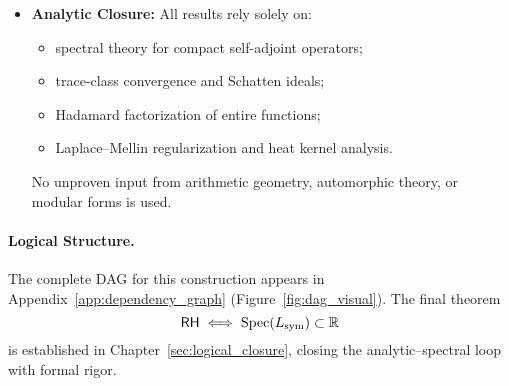 \begin{itemize}
  \item \textbf{Analytic Closure:}  
  All results rely solely on:
  \begin{itemize}
    \item spectral theory for compact self-adjoint operators;
    \item trace-class convergence and Schatten ideals;
    \item Hadamard factorization of entire functions;
    \item Laplace–Mellin regularization and heat kernel analysis.
  \end{itemize}
  No unproven input from arithmetic geometry, automorphic theory, or modular forms is used.
\end{itemize}

\paragraph{Logical Structure.}
The complete DAG for this construction appears in Appendix~\ref{app:dependency_graph} (Figure~\ref{fig:dag_visual}). The final theorem
\[
\mathsf{RH} \iff \operatorname{Spec}(L_{\mathrm{sym}}) \subset \mathbb{R}
\]
is established in Chapter~\ref{sec:logical_closure}, closing the analytic–spectral loop with formal rigor.
